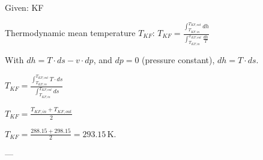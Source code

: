 Given: KF  

Thermodynamic mean temperature \( T_{KF} \):  
\( T_{KF} = \frac{\int_{T_{KF,in}}^{T_{KF,out}} dh}{\int_{T_{KF,in}}^{T_{KF,out}} \frac{dh}{T}} \)  

With \( dh = T \cdot ds - v \cdot dp \), and \( dp = 0 \) (pressure constant), \( dh = T \cdot ds \).  

\( T_{KF} = \frac{\int_{T_{KF,in}}^{T_{KF,out}} T \cdot ds}{\int_{T_{KF,in}}^{T_{KF,out}} ds} \)  

\( T_{KF} = \frac{T_{KF,in} + T_{KF,out}}{2} \)  

\( T_{KF} = \frac{288.15 + 298.15}{2} = 293.15 \, \text{K} \).  

---